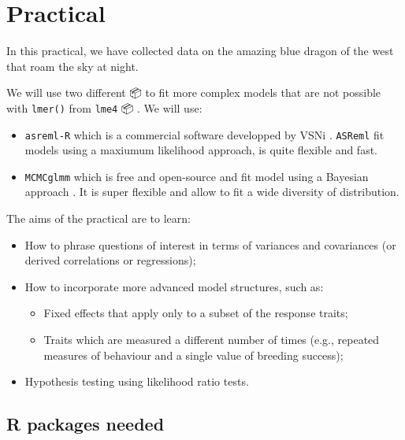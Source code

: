 \documentclass[
  12pt,
]{book}
\providecommand{\tightlist}{%
  \setlength{\itemsep}{0pt}\setlength{\parskip}{0pt}}
\begin{document}
\hypertarget{practical-5}{%
\section{Practical}\label{practical-5}}

In this practical, we have collected data on the amazing blue dragon of the west that roam the sky at night.

We will use two different 📦 to fit more complex models that are not possible with \texttt{lmer()} from \texttt{lme4}
📦 \citep{R-lme4}. We will use:

\begin{itemize}
\tightlist
\item
  \texttt{asreml-R} which is a commercial software developped by VSNi \citep{R-asreml}. \texttt{ASReml} fit models using a maxiumum likelihood approach, is quite flexible and fast.
\item
  \texttt{MCMCglmm} which is free and open-source and fit model using a Bayesian approach \citep{MCMCglmm2010}. It is super flexible and allow to fit a wide diversity of distribution.
\end{itemize}

The aims of the practical are to learn:

\begin{itemize}
\tightlist
\item
  How to phrase questions of interest in terms of variances and covariances (or derived correlations or regressions);
\item
  How to incorporate more advanced model structures, such as:

  \begin{itemize}
  \tightlist
  \item
    Fixed effects that apply only to a subset of the response traits;
  \item
    Traits which are measured a different number of times (e.g., repeated measures of behaviour and a single value of breeding success);
  \end{itemize}
\item
  Hypothesis testing using likelihood ratio tests.
\end{itemize}

\hypertarget{r-packages-needed-2}{%
\subsection{R packages needed}\label{r-packages-needed-2}}
\end{document}
